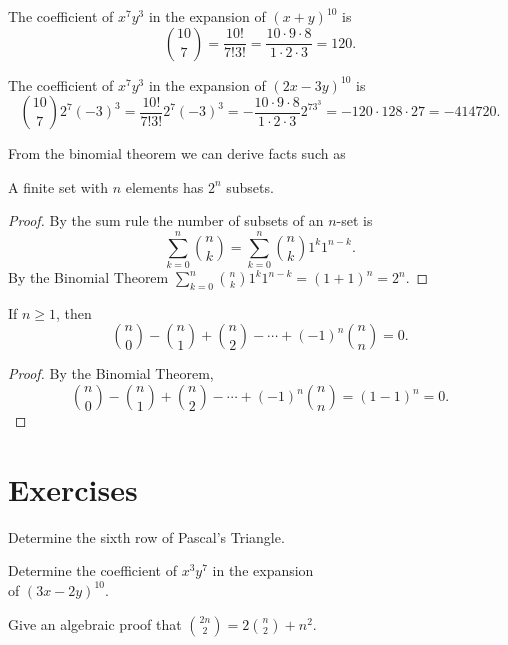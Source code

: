 \begin{exmp}
The coefficient of $x^7y^3$ in the expansion of $(x+y)^{10}$
is 
\[
 \binom{10}{7} = {\frac{10!}{7!3!}}= {\frac{10\cdot9\cdot8}{1\cdot2\cdot3}}
= 120.
\]
\end{exmp}

\begin{exmp}The coefficient of  $x^7y^3$ in the expansion of $(2x-3y)^{10}$ is 
\[
 {{10}\choose 7}2^7(-3)^3 = {\frac{10!}{7!3!}}2^7(-3)^3= -{\frac{10\cdot9\cdot8}{1\cdot2\cdot3}}
 2^73^3 
 = -120\cdot128\cdot27 = -414720.
\]
\end{exmp}

From the binomial theorem we can derive facts such as 

\begin{thm}
A finite set with $n$ elements has $2^n$ subsets.
\end{thm}
\begin{proof}
By the sum rule the number of subsets of an $n$-set is
\[
\sum_{k=0}^n {n\choose k}=\sum_{k=0}^n {n\choose k} 1^k 1^{n-k}.
\]
By the Binomial Theorem $\displaystyle{\sum_{k=0}^n {n\choose k} 1^k 1^{n-k} = (1+1)^n=2^n}.$
\end{proof}

\begin{thm}If $n\geq 1$, then 
\[
{n\choose 0}-{n\choose 1}
+{n\choose 2}-\cdots +(-1)^n {n\choose n} = 0.
\]
\end{thm}
\begin{proof}By the Binomial Theorem, 
\[{n\choose 0}-{n\choose 1}
+{n\choose 2}-\cdots +(-1)^n {n\choose n} = (1-1)^n = 0.
\]
\end{proof}

\clearpage
\section{Exercises}

\begin{exer}
Determine the sixth row of Pascal's Triangle.
\end{exer}

\begin{exer}
Determine the coefficient of  $x^3y^7$ in the expansion\\ of $(3x-2y)^{10}$.
\end{exer}

\begin{exer}
Give an algebraic proof that $\displaystyle {{2n}\choose 2} = 2{n\choose 2} + n^2$.
\end{exer}

